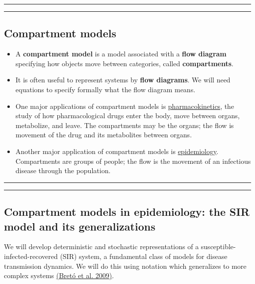 \documentclass[]{article}
\begin{document}
\begin{center}\rule{0.5\linewidth}{\linethickness}\end{center}

\begin{center}\rule{0.5\linewidth}{\linethickness}\end{center}

\subsection{Compartment models}\label{compartment-models}

\begin{itemize}
\item
  A \textbf{compartment model} is a model associated with a \textbf{flow
  diagram} specifying how objects move between categories, called
  \textbf{compartments}.
\item
  It is often useful to represent systems by \textbf{flow diagrams}. We
  will need equations to specify formally what the flow diagram means.
\item
  One major applications of compartment models is
  \href{https://en.wikipedia.org/wiki/Pharmacokinetics}{pharmacokinetics},
  the study of how pharmacological drugs enter the body, move between
  organs, metabolize, and leave. The compartments may be the organs; the
  flow is movement of the drug and its metabolites between organs.
\item
  Another major application of compartment models is
  \href{https://en.wikipedia.org/wiki/Compartmental_models_in_epidemiology}{epidemiology}.
  Compartments are groups of people; the flow is the movement of an
  infectious disease through the population.
\end{itemize}

\begin{center}\rule{0.5\linewidth}{\linethickness}\end{center}

\begin{center}\rule{0.5\linewidth}{\linethickness}\end{center}

\subsection{Compartment models in epidemiology: the SIR model and its
generalizations}\label{compartment-models-in-epidemiology-the-sir-model-and-its-generalizations}

We will develop deterministic and stochastic representations of a
susceptible-infected-recovered (SIR) system, a fundamental class of
models for disease transmission dynamics. We will do this using notation
which generalizes to more complex systems
\href{http://dept.stat.lsa.umich.edu/~ionides/pubs/breto09.pdf}{(Bretó
et al. 2009)}.
\end{document}
